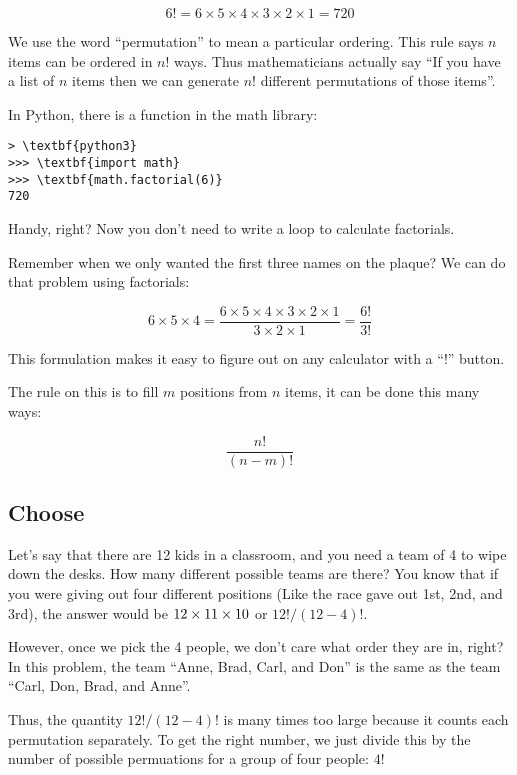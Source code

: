 $$6! = 6 \times 5 \times 4 \times 3 \times 2 \times 1 = 720$$

We use the word ``permutation'' to mean a particular ordering.
This rule says $n$ items can be ordered in $n!$ ways. Thus
mathematicians actually say ``If you have a list of $n$ items then we
can generate $n!$ different permutations of those items''.

In Python, there is a  function in the math library:
\begin{Verbatim}[commandchars=\\\{\}]
> \textbf{python3} 
>>> \textbf{import math}
>>> \textbf{math.factorial(6)}
720
\end{Verbatim}

Handy, right? Now you don't need to write a loop to calculate factorials.

Remember when we only wanted the first three names on the plaque? We can do that problem using factorials:

$$6 \times 5 \times 4 = \frac{6 \times 5 \times 4 \times 3 \times 2 \times 1}{3 \times 2 \times 1} = \frac{6!}{3!}$$

This formulation makes it easy to figure out on any calculator with a ``!'' button.

The rule on this is to fill $m$ positions from $n$ items, it can be done this many ways:

$$\frac{n!}{(n-m)!}$$

\subsection{Choose}

Let's say that there are 12 kids in a classroom, and you need a team
of 4 to wipe down the desks. How many different possible teams are
there? You know that if you were giving out four different positions
(Like the race gave out 1st, 2nd, and 3rd), the answer would be $12
\times 11 \times 10 \time 9$ or $12! / (12 - 4)!$.

However, once we pick the 4 people, we don't care what order they are
in, right?  In this problem, the team ``Anne, Brad, Carl, and Don'' is
the same as the team ``Carl, Don, Brad, and Anne''.

Thus, the quantity $12! / (12 - 4)!$ is many times too large because
it counts each permutation separately. To get the right number, we
just divide this by the number of possible permuations for a group of
four people: $4!$

